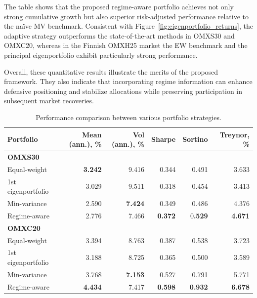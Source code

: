 \documentclass[pdflatex,sn-basic]{sn-jnl}%
\theoremstyle{thmstyleone}%
\theoremstyle{thmstyletwo}%
\theoremstyle{thmstylethree}%
\begin{document}
The table shows that the proposed regime-aware portfolio achieves not only strong cumulative growth but also superior risk-adjusted performance relative to the na\"{i}ve MV benchmark. Consistent with Figure~\ref{fig:eigenportfolio_returns}, the adaptive strategy outperforms the state-of-the-art methods in OMXS30 and OMXC20, whereas in the Finnish OMXH25 market the EW benchmark and the principal eigenportfolio exhibit particularly strong performance. 

Overall, these quantitative results illustrate the merits of the proposed framework. They also indicate that incorporating regime information can enhance defensive positioning and stabilize allocations while preserving participation in subsequent market recoveries.

\begin{table}
    \centering
    \caption{Performance comparison between various portfolio strategies.}
    \label{tab:summary_performance}
    \begin{tabular}{lrrrrr}
        \hline
     \textbf{Portfolio}  & \textbf{Mean (ann.), \%} & \textbf{Vol (ann.), \%} &  \textbf{Sharpe} & \textbf{Sortino} & \textbf{Treynor, \%}\\
        \hline
    \textbf{OMXS30}     & &   & &     &     \\
Equal-weight           & \textbf{3.242}        & 9.416        & 0.344        & 0.491        & 3.633        \\
1st eigenportfolio     & 3.029        & 9.511        & 0.318        & 0.454        & 3.413        \\
Min-variance           & 2.590        & \textbf{7.424}        & 0.349        & 0.486        & 4.376        \\
Regime-aware           & 2.776        & 7.466        & \textbf{0.372}        & 0\textbf{.529}        & \textbf{4.671}        \\
        \hline
    \textbf{OMXC20}     & &   & &     &     \\ 
Equal-weight           & 3.394        & 8.763        & 0.387        & 0.538        & 3.723        \\
1st eigenportfolio     & 3.188        & 8.725        & 0.365        & 0.500        & 3.589        \\
Min-variance           & 3.768        & \textbf{7.153}        & 0.527        & 0.791        & 5.771        \\
Regime-aware           & \textbf{4.434}        & 7.417        & \textbf{0.598}        & \textbf{0.932}        & \textbf{6.678}        \\

\end{tabular}
\end{table}
\end{document}

